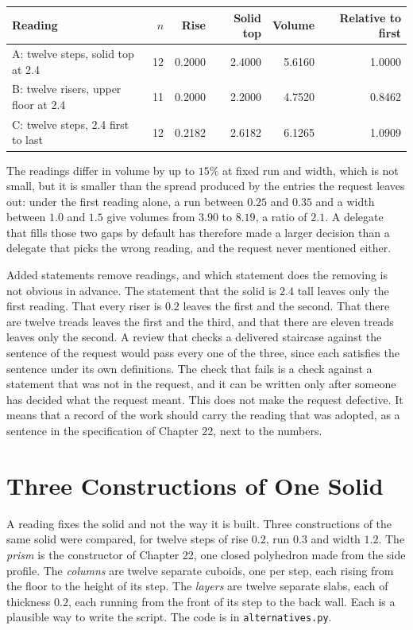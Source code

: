 \begin{center}
\small
\begin{tabular}{lrrrrr}
\toprule
Reading & $n$ & Rise & Solid top & Volume & Relative to first\\
\midrule
A: twelve steps, solid top at 2.4 & 12 & 0.2000 & 2.4000 & 5.6160 & 1.0000\\
B: twelve risers, upper floor at 2.4 & 11 & 0.2000 & 2.2000 & 4.7520 & 0.8462\\
C: twelve steps, 2.4 first to last & 12 & 0.2182 & 2.6182 & 6.1265 & 1.0909\\
\bottomrule
\end{tabular}
\end{center}

The readings differ in volume by up to $15\%$ at fixed run and width, which is not small, but it is smaller than the spread produced by the entries the request leaves out: under the first reading alone, a run between $0.25$ and $0.35$ and a width between $1.0$ and $1.5$ give volumes from $3.90$ to $8.19$, a ratio of $2.1$. A delegate that fills those two gaps by default has therefore made a larger decision than a delegate that picks the wrong reading, and the request never mentioned either.

Added statements remove readings, and which statement does the removing is not obvious in advance. The statement that the solid is $2.4$ tall leaves only the first reading. That every riser is $0.2$ leaves the first and the second. That there are twelve treads leaves the first and the third, and that there are eleven treads leaves only the second. A review that checks a delivered staircase against the sentence of the request would pass every one of the three, since each satisfies the sentence under its own definitions. The check that fails is a check against a statement that was not in the request, and it can be written only after someone has decided what the request meant. This does not make the request defective. It means that a record of the work should carry the reading that was adopted, as a sentence in the specification of Chapter 22, next to the numbers.

\section{Three Constructions of One Solid}

A reading fixes the solid and not the way it is built. Three constructions of the same solid were compared, for twelve steps of rise $0.2$, run $0.3$ and width $1.2$. The \emph{prism} is the constructor of Chapter 22, one closed polyhedron made from the side profile. The \emph{columns} are twelve separate cuboids, one per step, each rising from the floor to the height of its step. The \emph{layers} are twelve separate slabs, each of thickness $0.2$, each running from the front of its step to the back wall. Each is a plausible way to write the script. The code is in \texttt{alternatives.py}.

